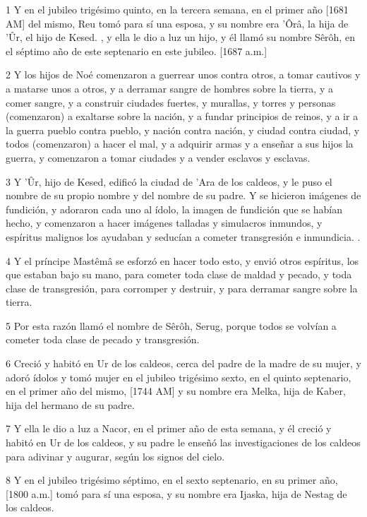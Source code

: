 \par 1 Y en el jubileo trigésimo quinto, en la tercera semana, en el primer año [1681 AM] del mismo, Reu tomó para sí una esposa, y su nombre era 'Ôrâ, la hija de 'Ûr, el hijo de Kesed. , y ella le dio a luz un hijo, y él llamó su nombre Sêrôh, en el séptimo año de este septenario en este jubileo. [1687 a.m.]
\par 2 Y los hijos de Noé comenzaron a guerrear unos contra otros, a tomar cautivos y a matarse unos a otros, y a derramar sangre de hombres sobre la tierra, y a comer sangre, y a construir ciudades fuertes, y murallas, y torres y personas (comenzaron) a exaltarse sobre la nación, y a fundar principios de reinos, y a ir a la guerra pueblo contra pueblo, y nación contra nación, y ciudad contra ciudad, y todos (comenzaron) a hacer el mal, y a adquirir armas y a enseñar a sus hijos la guerra, y comenzaron a tomar ciudades y a vender esclavos y esclavas.
\par 3 Y 'Ûr, hijo de Kesed, edificó la ciudad de 'Ara de los caldeos, y le puso el nombre de su propio nombre y del nombre de su padre. Y se hicieron imágenes de fundición, y adoraron cada uno al ídolo, la imagen de fundición que se habían hecho, y comenzaron a hacer imágenes talladas y simulacros inmundos, y espíritus malignos los ayudaban y seducían a cometer transgresión e inmundicia. .
\par 4 Y el príncipe Mastêmâ se esforzó en hacer todo esto, y envió otros espíritus, los que estaban bajo su mano, para cometer toda clase de maldad y pecado, y toda clase de transgresión, para corromper y destruir, y para derramar sangre sobre la tierra.
\par 5 Por esta razón llamó el nombre de Sêrôh, Serug, porque todos se volvían a cometer toda clase de pecado y transgresión.
\par 6 Creció y habitó en Ur de los caldeos, cerca del padre de la madre de su mujer, y adoró ídolos y tomó mujer en el jubileo trigésimo sexto, en el quinto septenario, en el primer año del mismo, [1744 AM] y su nombre era Melka, hija de Kaber, hija del hermano de su padre.
\par 7 Y ella le dio a luz a Nacor, en el primer año de esta semana, y él creció y habitó en Ur de los caldeos, y su padre le enseñó las investigaciones de los caldeos para adivinar y augurar, según los signos del cielo.
\par 8 Y en el jubileo trigésimo séptimo, en el sexto septenario, en su primer año, [1800 a.m.] tomó para sí una esposa, y su nombre era Ijaska, hija de Nestag de los caldeos.
